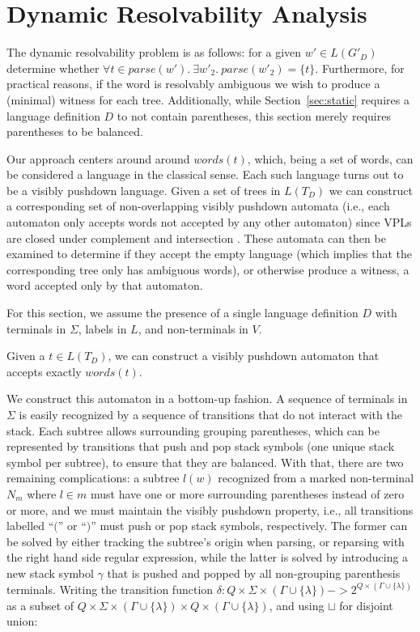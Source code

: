 \documentclass[acmsmall,review,anonymous]{acmart}\settopmatter{printfolios=true,printccs=false,printacmref=false}
\newcommand{\NT}{V} %
\newcommand{\T}{\Sigma} %
\newcommand{\Labels}{L} %
\newcommand{\parse}{\mathit{parse}} %
\newcommand{\words}{\mathit{words}} %
\begin{document}
\section{Dynamic Resolvability Analysis} \label{sec:dynamic}

The dynamic resolvability problem is as follows: for a given $w' \in L(G'_D)$ determine whether $\forall t \in \parse(w').\ \exists w'_2.\ \parse(w'_2) = \{t\}$. Furthermore, for practical reasons, if the word is resolvably ambiguous we wish to produce a (minimal) witness for each tree. Additionally, while Section~\ref{sec:static} requires a language definition $D$ to not contain parentheses, this section merely requires parentheses to be balanced.

Our approach centers around around $\words(t)$, which, being a set of words, can be considered a language in the classical sense. Each such language turns out to be a visibly pushdown language. Given a set of trees in $L(T_D)$ we can construct a corresponding set of non-overlapping visibly pushdown automata (i.e., each automaton only accepts words not accepted by any other automaton) since VPLs are closed under complement and intersection \cite{alurVisiblyPushdownLanguages2004}. These automata can then be examined to determine if they accept the empty language (which implies that the corresponding tree only has ambiguous words), or otherwise produce a witness, a word accepted only by that automaton.

For this section, we assume the presence of a single language definition $D$ with terminals in $\T$, labels in $\Labels$, and non-terminals in $\NT$.

\begin{theorem}
  Given a $t \in L(T_D)$, we can construct a visibly pushdown automaton that accepts exactly $\words(t)$.
\end{theorem}

\noindent We construct this automaton in a bottom-up fashion. A sequence of terminals in $\T$ is easily recognized by a sequence of transitions that do not interact with the stack. Each subtree allows surrounding grouping parentheses, which can be represented by transitions that push and pop stack symbols (one unique stack symbol per subtree), to ensure that they are balanced. With that, there are two remaining complications: a subtree $l(w)$ recognized from a marked non-terminal $N_m$ where $l \in m$ must have one or more surrounding parentheses instead of zero or more, and we must maintain the visibly pushdown property, i.e., all transitions labelled ``$($'' or ``$)$'' must push or pop stack symbols, respectively. The former can be solved by either tracking the subtree's origin when parsing, or reparsing with the right hand side regular expression, while the latter is solved by introducing a new stack symbol $\gamma$ that is pushed and popped by all non-grouping parenthesis terminals. Writing the transition function $\delta : Q \times \T \times (\Gamma \cup \{\lambda\}) -> 2^{Q \times (\Gamma \cup \{\lambda\})}$ as a subset of $Q \times \T \times (\Gamma \cup \{\lambda\}) \times Q \times (\Gamma \cup \{\lambda\})$, and using $\sqcup$ for disjoint union:
\end{document}
